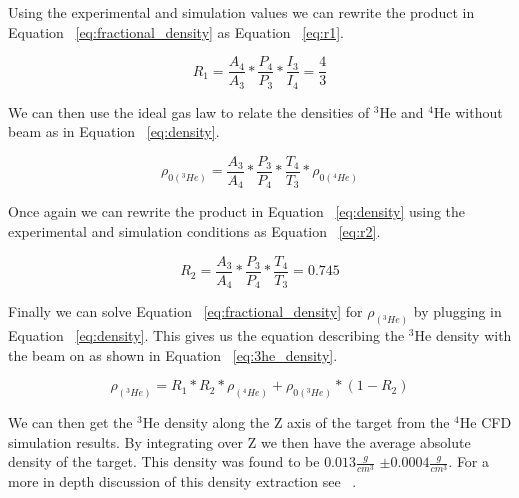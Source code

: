Using the experimental and simulation values we can rewrite the product in Equation ~\ref{eq:fractional_density} as Equation ~\ref{eq:r1}.

\begin{equation} \label{eq:r1}
	R_1 = \frac{A_4}{A_3} * \frac{P_4}{P_3} * \frac{I_3}{I_4} = \frac{4}{3}
\end{equation}

\noindent We can then use the ideal gas law to relate the densities of $^3$He and $^4$He without beam as in Equation ~\ref{eq:density}.

\begin{equation} \label{eq:density}
	\rho_{0\left(^3He\right)} = \frac{A_3}{A_4} * \frac{P_3}{P_4} * \frac{T_4}{T_3} * \rho_{0\left(^4He\right)}
\end{equation}

\noindent Once again we can rewrite the product in Equation ~\ref{eq:density} using the experimental and simulation conditions as Equation ~\ref{eq:r2}.

\begin{equation} \label{eq:r2}
	R_2 = \frac{A_3}{A_4} * \frac{P_3}{P_4} * \frac{T_4}{T_3} = 0.745
\end{equation}

Finally we can solve Equation ~\ref{eq:fractional_density} for $\rho_{\left(^3He\right)}$ by plugging in Equation ~\ref{eq:density}. This gives us the equation describing the $^3$He density with the beam on as shown in Equation ~\ref{eq:3he_density}.

\begin{equation} \label{eq:3he_density}
	\rho_{\left(^3He\right)} = R_1 * R_2 * \rho_{\left(^4He\right)} + \rho_{0\left(^3He\right)} * (1-R_2)
\end{equation}

\noindent We can then get the $^3$He density along the Z axis of the target from the $^4$He CFD simulation results. By integrating over Z we then have the average absolute density of the target. This density was found to be $0.013 \frac{g}{cm^3}$ $\pm 0.0004 \frac{g}{cm^3}$. For a more in depth discussion of this density extraction see ~\cite{density}.


